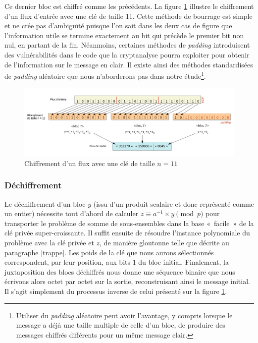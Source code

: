 \documentclass[a4paper,10pt]{article}
\begin{document}
Ce dernier bloc est chiffré comme les précédents. La figure \ref{chiffrement} illustre le chiffrement d'un flux d'entrée avec une clé de taille 11. Cette méthode de bourrage est simple et ne crée pas d'ambiguïté puisque l'on sait dans les deux cas de figure que l'information utile se termine exactement au bit qui précède le premier bit non nul, en partant de la fin. Néanmoins, certaines méthodes de \textit{padding} introduisent des vulnérabilités dans le code que la cryptanalyse pourra exploiter pour obtenir de l'information sur le message en clair. Il existe ainsi des méthodes standardisées de \textit{padding} aléatoire que nous n'aborderons pas dans notre étude\footnote{Utiliser du \textit{padding} aléatoire peut avoir l'avantage, y compris lorsque le message a déjà une taille multiple de celle d'un bloc, de produire des messages chiffrés différents pour un même message clair.}.

\begin{figure}[!h]
\begin{center}
\hspace*{-0.8in}
  \centering
  \includegraphics[width=20cm]{images/chiffrement.pdf}
  \caption{Chiffrement d'un flux avec une clé de taille $n = 11$}
  \label{chiffrement}
\end{center}
\end{figure}

\newpage

\subsubsection{Déchiffrement}

Le déchiffrement d'un bloc $y$ (issu d'un produit scalaire et donc représenté comme un entier) nécessite tout d'abord de calculer $z \equiv a^{-1} \times y \pmod p$ pour transporter le problème de somme de sous-ensembles dans la base «~facile~» de la clé privée super-croissante. Il suffit ensuite de résoudre l'instance polynomiale du problème avec la clé privée et $z$, de manière gloutonne telle que décrite au paragraphe \ref{trappe}. Les poids de la clé que nous aurons sélectionnés correspondent, par leur position, aux bits $1$ du bloc initial. Finalement, la juxtaposition des blocs déchiffrés nous donne une séquence binaire que nous écrivons alors octet par octet sur la sortie, reconstruisant ainsi le message initial. Il s'agit simplement du processus inverse de celui présenté sur la figure \ref{chiffrement}.
\end{document}
